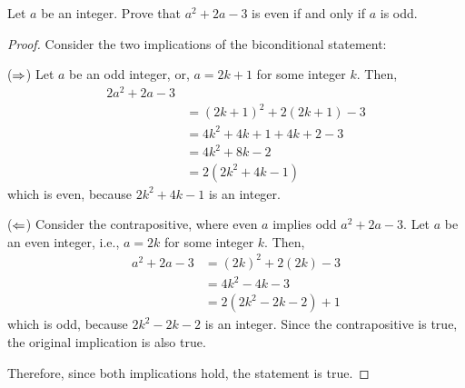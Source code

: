 \question Let $a$ be an integer. Prove that $a^2 + 2a - 3$ is even if and only if $a$ is odd.
\begin{proof}
  Consider the two implications of the biconditional statement:

  ($\Rightarrow$) Let $a$ be an odd integer, or, $a = 2k+1$ for some integer $k$. Then,
  \begin{align*}{2}
    a^2 + 2a - 3                    \\
     & = (2k + 1)^2 + 2(2k + 1) - 3 \\
     & = 4k^2 + 4k + 1 + 4k + 2 - 3 \\
     & = 4k^2 + 8k - 2              \\
     & = 2(2k^2 + 4k - 1)
  \end{align*}
  which is even, because $2k^2+4k-1$ is an integer.

  ($\Leftarrow$) Consider the contrapositive, where even $a$ implies odd $a^2 + 2a - 3$.
  Let $a$ be an even integer, i.e., $a = 2k$ for some integer $k$. Then,
  \begin{align*}
    a^2 + 2a - 3
     & = (2k)^2 + 2(2k) - 3   \\
     & = 4k^2 - 4k - 3        \\
     & = 2(2k^2 - 2k - 2) + 1
  \end{align*}
  which is odd, because $2k^2 - 2k - 2$ is an integer.
  Since the contrapositive is true, the original implication is also true.

  Therefore, since both implications hold, the statement is true.
\end{proof}


